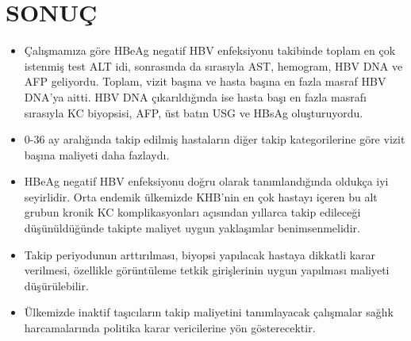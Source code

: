 
\newpage

\section{SONUÇ}


\begin{itemize}

\item Çalışmamıza göre HBeAg negatif HBV enfeksiyonu takibinde toplam en çok istenmiş test ALT idi, sonrasında da sırasıyla AST, hemogram, HBV DNA ve AFP geliyordu.  Toplam, vizit başına ve hasta başına en fazla masraf HBV DNA'ya aitti. HBV DNA çıkarıldığında ise hasta başı en fazla masrafı sırasıyla KC biyopsisi, AFP, üst batın USG ve HBsAg oluşturuyordu.

\item 0-36 ay aralığında takip edilmiş hastaların diğer takip kategorilerine göre vizit başına maliyeti daha fazlaydı.

\item HBeAg negatif HBV enfeksiyonu doğru olarak tanımlandığında oldukça iyi seyirlidir. Orta endemik ülkemizde KHB'nin en çok hastayı içeren bu alt grubun kronik KC komplikasyonları açısından yıllarca takip edileceği düşünüldüğünde takipte maliyet uygun yaklaşımlar benimsenmelidir.

\item Takip periyodunun arttırılması, biyopsi yapılacak hastaya dikkatli karar verilmesi, özellikle görüntüleme tetkik girişlerinin uygun yapılması maliyeti düşürülebilir. 

\item Ülkemizde inaktif taşıcıların takip maliyetini tanımlayacak çalışmalar sağlık harcamalarında politika karar vericilerine yön gösterecektir.

\end{itemize}

 